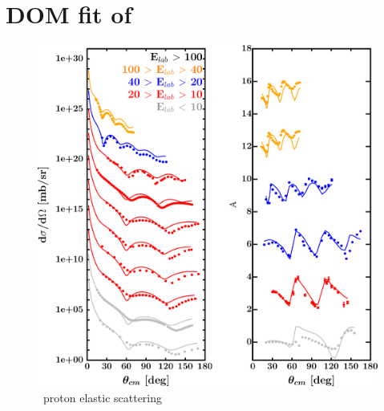 \section{DOM fit of \niFour}
\label{ni64DOMOutput}
\begin{figure}[hbtp]
    \centering
    \begin{minipage}{0.47\textwidth}
        \centering
        \includegraphics[width=\textwidth]{figures/ni64_protonElastic.png}
        \caption*{\niFour\ proton elastic scattering}
        \label{DOMFitData_ni64_proton_elastic}
    \end{minipage}\hspace{6pt}
    \begin{minipage}{0.47\textwidth}
        \centering

\end{minipage}
\end{figure}
